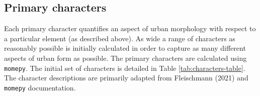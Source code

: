 \documentclass[a4paper, nobind]{templates/ociamthesis}
\begin{document}
\hypertarget{primary-characters}{%
\subsection{Primary characters}\label{primary-characters}}

Each primary character quantifies an aspect of urban morphology with respect to a particular element (as described above). As wide a range of characters as reasonably possible is initially calculated in order to capture as many different aspects of urban form as possible. The primary characters are calculated using \texttt{momepy}. The initial set of characters is detailed in Table \ref{tab:characters-table}. The character descriptions are primarily adapted from Fleischmann (2021) \citet{fleischmannUrbanAtlasMethodological2021} and \texttt{momepy} documentation.
\end{document}
